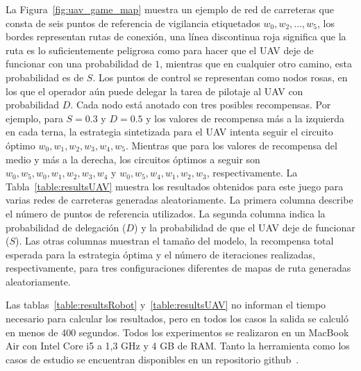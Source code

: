 %
La Figura~\ref{fig:uav_game_map} muestra un ejemplo de red de carreteras que consta de seis puntos de referencia de vigilancia etiquetados $w_0,w_2,...,w_5$, los bordes representan rutas de conexión, una línea discontinua roja significa que la ruta es lo suficientemente peligrosa como para hacer que el UAV deje de funcionar con una probabilidad de $1$, mientras que en cualquier otro camino, esta probabilidad es de $S$. Los puntos de control se representan como nodos rosas, en los que el operador aún puede delegar la tarea de pilotaje al UAV con probabilidad $D$. Cada nodo está anotado con tres posibles recompensas. Por ejemplo, para $S=0.3$ y $D=0.5$ y los valores de recompensa más a la izquierda en cada terna, la estrategia sintetizada para el UAV intenta seguir el circuito óptimo $w_0,w_1,w_2,w_3,w_4,w_5$. Mientras que para los valores de recompensa del medio y más a la derecha, los circuitos óptimos a seguir son $w_0,w_5,w_0,w_1,w_2,w_3,w_4$ y $w_0,w_5,w_4,w_1,w_2,w_3$, respectivamente. 
La Tabla~\ref{table:resultsUAV} muestra los resultados obtenidos para este juego para varias redes de carreteras generadas aleatoriamente. La primera columna describe el número de puntos de referencia utilizados. La segunda columna indica la probabilidad de delegación ($D$) y la probabilidad de que el UAV deje de funcionar ($S$).
Las otras columnas muestran el tamaño del modelo, la recompensa total esperada para la estrategia óptima y el número de iteraciones realizadas, respectivamente, para tres configuraciones diferentes de mapas de ruta generadas aleatoriamente.

Las tablas~\ref{table:resultsRobot} y~\ref{table:resultsUAV} no informan el tiempo necesario para calcular los resultados, pero en todos los casos la salida se calculó en menos de 400 segundos. Todos los experimentos se realizaron en un MacBook Air con Intel Core i5 a 1,3 GHz y 4 GB de RAM. Tanto la herramienta como los casos de estudio se encuentran disponibles en un repositorio github~\cite{FairPrism}.

